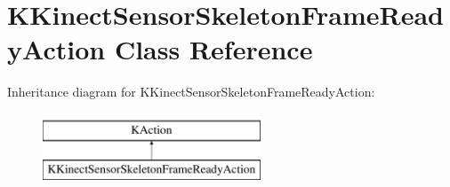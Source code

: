 \hypertarget{class_k_kinect_sensor_skeleton_frame_ready_action}{\section{\-K\-Kinect\-Sensor\-Skeleton\-Frame\-Ready\-Action \-Class \-Reference}
\label{class_k_kinect_sensor_skeleton_frame_ready_action}
}
\-Inheritance diagram for \-K\-Kinect\-Sensor\-Skeleton\-Frame\-Ready\-Action\-:\begin{figure}[H]
\begin{center}
\leavevmode
\includegraphics[height=2.000000cm]{class_k_kinect_sensor_skeleton_frame_ready_action}
\end{center}
\end{figure}

